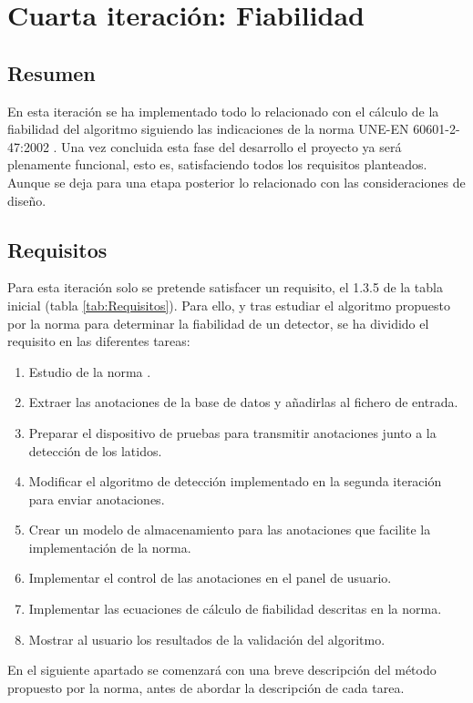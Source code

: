 
\section{Cuarta iteración: Fiabilidad}
    \subsection{Resumen}
        
        En esta iteración se ha implementado todo lo relacionado con el cálculo de la fiabilidad del algoritmo siguiendo las indicaciones de la norma UNE-EN 60601-2-47:2002 \cite{Aenor2002}. Una vez concluida esta fase del desarrollo el proyecto ya será plenamente funcional, esto es, satisfaciendo todos los requisitos planteados. Aunque se deja para una etapa posterior lo relacionado con las consideraciones de diseño.
        
    \subsection{Requisitos}
    
        Para esta iteración solo se pretende satisfacer un requisito, el 1.3.5 de la tabla inicial (tabla \ref{tab:Requisitos}). Para ello, y tras estudiar el algoritmo propuesto por la norma para determinar la fiabilidad de un detector, se ha dividido el requisito en las diferentes tareas:
        
        \begin{enumerate}
            \item Estudio de la norma \cite{Aenor2002}.
            \item Extraer las anotaciones de la base de datos y añadirlas al fichero de entrada.
            \item Preparar el dispositivo de pruebas para transmitir anotaciones junto a la detección de los latidos.
            \item Modificar el algoritmo de detección implementado en la segunda iteración para enviar anotaciones.
            \item Crear un modelo de almacenamiento para las anotaciones que facilite la implementación de la norma. \cite{Aenor2002}
            \item Implementar el control de las anotaciones en el panel de usuario.
            \item Implementar las ecuaciones de cálculo de fiabilidad descritas en la norma. \cite{Aenor2002}
            \item Mostrar al usuario los resultados de la validación del algoritmo.
        \end{enumerate}
    En el siguiente apartado se comenzará con una breve descripción del método propuesto por la norma, antes de abordar la descripción de cada tarea. 
    
